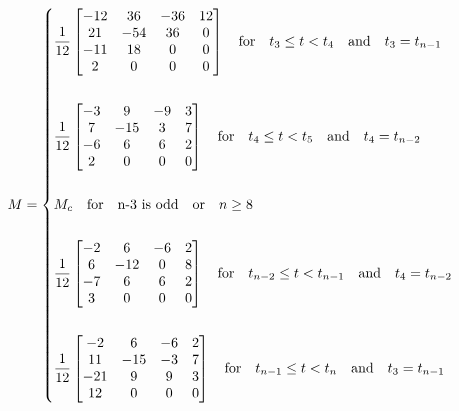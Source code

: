 \documentclass{article}
\begin{document}
    \begin{equation}
        M = \begin{dcases} 
            \frac{1}{12}\begin{bmatrix} -12 &  36 & -36 & 12 \\
                                         21 & -54 &  36 & 0 \\
                                        -11 &  18 &  0  & 0 \\
                                         2  &   0 &  0  & 0 \end{bmatrix} \quad \text{for} \quad t_3 \leq t < t_{4} \quad \text{and} \quad t_3 = t_{n-1}\\\\
            \frac{1}{12}\begin{bmatrix} -3 &  9  & -9 & 3 \\
                                         7 & -15 &  3 & 7 \\
                                        -6 &  6  &  6 & 2 \\
                                         2 &  0  &  0 & 0 \end{bmatrix} \quad \text{for} \quad t_{4} \leq t < t_{5} \quad \text{and} \quad t_4 = t_{n-2}\\\\
            M_c \quad \text{for} \quad \text{n-3 is odd} \quad \text{or} \quad n\geq 8 \\\\
            \frac{1}{12} \begin{bmatrix} -2 & 6 & -6 & 2 \\
                                          6 & -12 & 0 & 8 \\
                                         -7 & 6 & 6 & 2 \\
                                          3 & 0 & 0 & 0
                                      \end{bmatrix} \quad \text{for} \quad t_{n-2} \leq t < t_{n-1} \quad \text{and} \quad t_4 = t_{n-2} \\\\
            \frac{1}{12} \begin{bmatrix} -2 & 6 & -6 & 2 \\
                                         11 & -15 & -3 & 7 \\
                                        -21 & 9 & 9 & 3 \\
                                         12 & 0 & 0 & 0
                                      \end{bmatrix} \quad \text{for} \quad t_{n-1} \leq t < t_{n} \quad \text{and} \quad t_3 = t_{n-1}
            \end{dcases}
    \end{equation}
    
\end{document}
